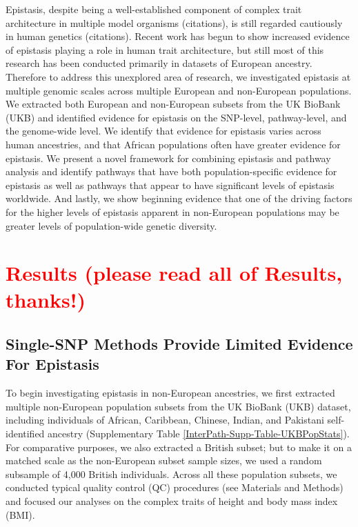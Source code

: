 \documentclass[12pt,a4paper]{article}
\begin{document}
Epistasis, despite being a well-established component of complex trait architecture in multiple model organisms (citations), is still regarded cautiously in human genetics (citations). Recent work has begun to show increased evidence of epistasis playing a role in human trait architecture, but still most of this research has been conducted primarily in datasets of European ancestry. Therefore to address this unexplored area of research, we investigated epistasis at multiple genomic scales across multiple European and non-European populations. We extracted both European and non-European subsets from the UK BioBank (UKB) \citep{Sudlow2015} and identified evidence for epistasis on the SNP-level, pathway-level, and the genome-wide level. We identify that evidence for epistasis varies across human ancestries, and that African populations often have greater evidence for epistasis. We present a novel framework for combining epistasis and pathway analysis and identify pathways that have both population-specific evidence for epistasis as well as pathways that appear to have significant levels of epistasis worldwide. And lastly, we show beginning evidence that one of the driving factors for the higher levels of epistasis apparent in non-European populations may be greater levels of population-wide genetic diversity.





\section{\textcolor{red}{Results (please read all of Results, thanks!)}}\label{InterPath-Results}

\subsection{Single-SNP Methods Provide Limited Evidence For Epistasis}\label{InterPath-Results-SNPEpistasis}

To begin investigating epistasis in non-European ancestries, we first extracted multiple non-European population subsets from the UK BioBank (UKB) dataset, including individuals of African, Caribbean, Chinese, Indian, and Pakistani self-identified ancestry (Supplementary Table \ref{InterPath-Supp-Table-UKBPopStats}). For comparative purposes, we also extracted a British subset; but to make it on a matched scale as the non-European subset sample sizes, we used a random subsample of 4,000 British individuals. Across all these population subsets, we conducted typical quality control (QC) procedures (see Materials and Methods) and focused our analyses on the complex traits of height and body mass index (BMI). 
\end{document}
